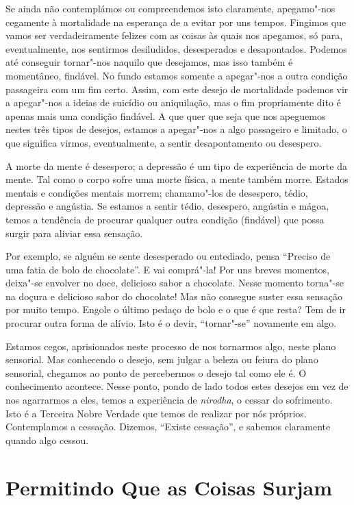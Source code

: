 Se ainda não contemplámos ou compreendemos isto claramente, apegamo"-nos
cegamente à mortalidade na esperança de a evitar por uns tempos. Fingimos
que vamos ser verdadeiramente felizes com as coisas às quais nos apegamos, só
para, eventualmente, nos sentirmos desiludidos, desesperados e desapontados.
Podemos até conseguir tornar"-nos naquilo que desejamos, mas isso também é
momentâneo, findável. No fundo estamos somente a apegar"-nos a outra condição
passageira com um fim certo. Assim, com este desejo de mortalidade podemos vir a
apegar"-nos a ideias de suicídio ou aniquilação, mas o fim propriamente dito é
apenas mais uma condição findável. A que quer que seja que nos apeguemos nestes
três tipos de desejos, estamos a apegar"-nos a algo passageiro e limitado, o que
significa virmos, eventualmente, a sentir desapontamento ou desespero.

A morte da mente é desespero; a depressão é um tipo de experiência de morte da
mente. Tal como o corpo sofre uma morte física, a mente também morre. Estados
mentais e condições mentais morrem; chamamo"-los de desespero, tédio, depressão e
angústia. Se estamos a sentir tédio, desespero, angústia e mágoa, temos a
tendência de procurar qualquer outra condição (findável) que possa surgir para
aliviar essa sensação.

Por exemplo, se alguém se sente desesperado ou entediado, pensa “Preciso de uma
fatia de bolo de chocolate”. E vai comprá"-la! Por uns breves momentos, deixa"-se
envolver no doce, delicioso sabor a chocolate. Nesse momento torna"-se na doçura
e delicioso sabor do chocolate! Mas não consegue suster essa sensação por muito
tempo. Engole o último pedaço de bolo e o que é que resta? Tem de ir procurar
outra forma de alívio. Isto é o devir, “tornar"-se” novamente em algo.

Estamos cegos, aprisionados neste processo de nos tornarmos algo, neste plano
sensorial. Mas conhecendo o desejo, sem julgar a beleza ou feiura do plano
sensorial, chegamos ao ponto de percebermos o desejo tal como ele é. O
conhecimento acontece. Nesse ponto, pondo de lado todos estes desejos em vez de
nos agarrarmos a eles, temos a experiência de \emph{nirodha}, o cessar do
sofrimento. Isto é a Terceira Nobre Verdade que temos de realizar por nós
próprios. Contemplamos a cessação. Dizemos, “Existe cessação”, e sabemos
claramente quando algo cessou.

\section{Permitindo Que as Coisas Surjam}

